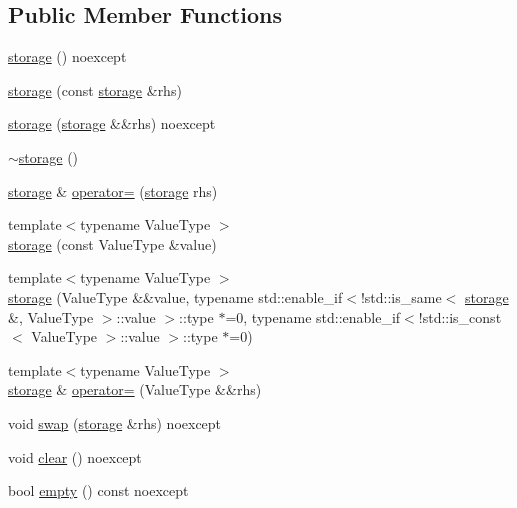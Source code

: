 \subsection*{Public Member Functions}
\begin{DoxyCompactItemize}
\item 
\hyperlink{structmui_1_1storage_a9bb5dc71b97c97a84271d5be1220bb96}{storage} () noexcept
\item 
\hyperlink{structmui_1_1storage_a758ceb44dccb01bca5c67618ff268afb}{storage} (const \hyperlink{structmui_1_1storage}{storage} \&rhs)
\item 
\hyperlink{structmui_1_1storage_a1c7e09bddc9b61b60864ea2a15ba711b}{storage} (\hyperlink{structmui_1_1storage}{storage} \&\&rhs) noexcept
\item 
\hyperlink{structmui_1_1storage_a232ca56659fdb43242c954686e976256}{$\sim$storage} ()
\item 
\hyperlink{structmui_1_1storage}{storage} \& \hyperlink{structmui_1_1storage_a72090012dadb313e33077b106243376c}{operator=} (\hyperlink{structmui_1_1storage}{storage} rhs)
\item 
{\footnotesize template$<$typename Value\+Type $>$ }\\\hyperlink{structmui_1_1storage_a5cca4dff7c9484c9ef37987677345dcd}{storage} (const Value\+Type \&value)
\item 
{\footnotesize template$<$typename Value\+Type $>$ }\\\hyperlink{structmui_1_1storage_ab9d92360c543064c66c6746fc5ea707c}{storage} (Value\+Type \&\&value, typename std\+::enable\+\_\+if$<$!std\+::is\+\_\+same$<$ \hyperlink{structmui_1_1storage}{storage} \&, Value\+Type $>$\+::value $>$\+::type $\ast$=0, typename std\+::enable\+\_\+if$<$!std\+::is\+\_\+const$<$ Value\+Type $>$\+::value $>$\+::type $\ast$=0)
\item 
{\footnotesize template$<$typename Value\+Type $>$ }\\\hyperlink{structmui_1_1storage}{storage} \& \hyperlink{structmui_1_1storage_a1c9113c4d41c9be4ed22ccd4e0819211}{operator=} (Value\+Type \&\&rhs)
\item 
void \hyperlink{structmui_1_1storage_a8033776a5221d7de496361d1977673cc}{swap} (\hyperlink{structmui_1_1storage}{storage} \&rhs) noexcept
\item 
void \hyperlink{structmui_1_1storage_a7772a509f7ad3fdbade17be39341460b}{clear} () noexcept
\item 
bool \hyperlink{structmui_1_1storage_adcf21fcd6f81c02f8cf98f5055975dca}{empty} () const noexcept

\end{DoxyCompactItemize}
